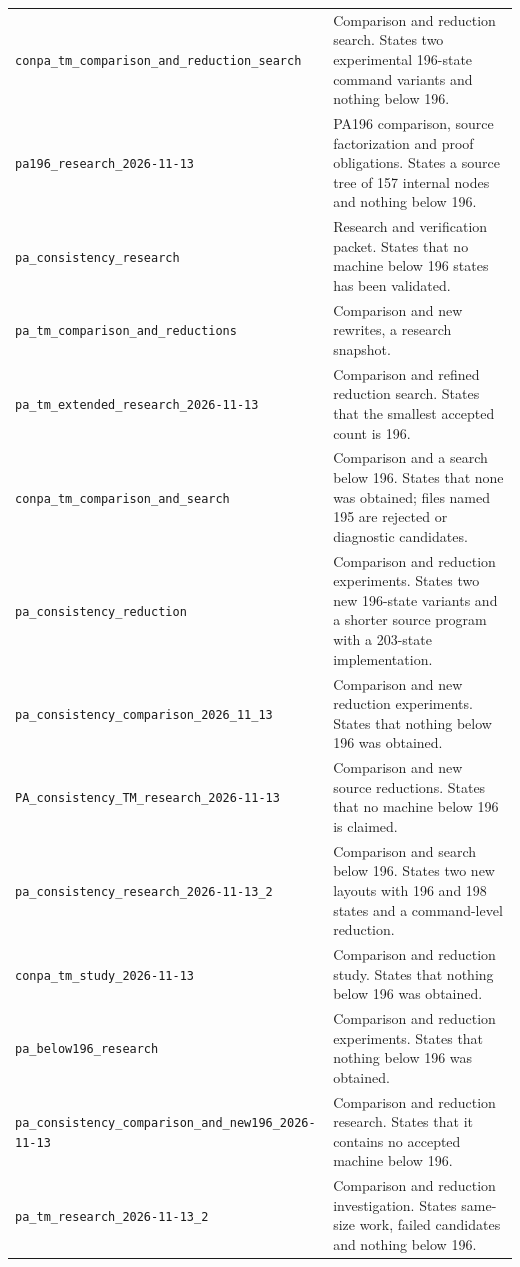 {\begin{longtable}{p{}p{}}
\nolinkurl{conpa_tm_comparison_and_reduction_search} & Comparison and reduction search. States two experimental 196-state command variants and nothing below 196.\\[7pt]
\nolinkurl{pa196_research_2026-11-13} & PA196 comparison, source factorization and proof obligations. States a source tree of 157 internal nodes and nothing below 196.\\[7pt]
\nolinkurl{pa_consistency_research} & Research and verification packet. States that no machine below 196 states has been validated.\\[7pt]
\nolinkurl{pa_tm_comparison_and_reductions} & Comparison and new rewrites, a research snapshot.\\[7pt]
\nolinkurl{pa_tm_extended_research_2026-11-13} & Comparison and refined reduction search. States that the smallest accepted count is 196.\\[7pt]
\nolinkurl{conpa_tm_comparison_and_search} & Comparison and a search below 196. States that none was obtained; files named 195 are rejected or diagnostic candidates.\\[7pt]
\nolinkurl{pa_consistency_reduction} & Comparison and reduction experiments. States two new 196-state variants and a shorter source program with a 203-state implementation.\\[7pt]
\nolinkurl{pa_consistency_comparison_2026_11_13} & Comparison and new reduction experiments. States that nothing below 196 was obtained.\\[7pt]
\nolinkurl{PA_consistency_TM_research_2026-11-13} & Comparison and new source reductions. States that no machine below 196 is claimed.\\[7pt]
\nolinkurl{pa_consistency_research_2026-11-13_2} & Comparison and search below 196. States two new layouts with 196 and 198 states and a command-level reduction.\\[7pt]
\nolinkurl{conpa_tm_study_2026-11-13} & Comparison and reduction study. States that nothing below 196 was obtained.\\[7pt]
\nolinkurl{pa_below196_research} & Comparison and reduction experiments. States that nothing below 196 was obtained.\\[7pt]
\nolinkurl{pa_consistency_comparison_and_new196_2026-11-13} & Comparison and reduction research. States that it contains no accepted machine below 196.\\[7pt]
\nolinkurl{pa_tm_research_2026-11-13_2} & Comparison and reduction investigation. States same-size work, failed candidates and nothing below 196.\\[7pt]

\end{longtable}}
